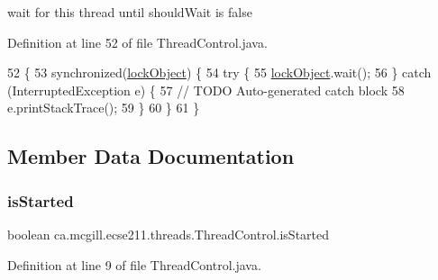 wait for this thread until should\+Wait is false 

Definition at line 52 of file Thread\+Control.\+java.


\begin{DoxyCode}
52                                   \{
53     \textcolor{keyword}{synchronized}(\hyperlink{classca_1_1mcgill_1_1ecse211_1_1threads_1_1_thread_control_ab20c44ff2dafab8981c42fa8bf634dfc}{lockObject}) \{
54       \textcolor{keywordflow}{try} \{
55         \hyperlink{classca_1_1mcgill_1_1ecse211_1_1threads_1_1_thread_control_ab20c44ff2dafab8981c42fa8bf634dfc}{lockObject}.wait();
56       \} \textcolor{keywordflow}{catch} (InterruptedException e) \{
57         \textcolor{comment}{// TODO Auto-generated catch block}
58         e.printStackTrace();
59       \}
60     \}
61   \}
\end{DoxyCode}


\subsection{Member Data Documentation}
\mbox{\label{classca_1_1mcgill_1_1ecse211_1_1threads_1_1_thread_control_abb0ba2385c212f3d0d8435267d882536}} 
\subsubsection{\texorpdfstring{is\+Started}{isStarted}}
{\footnotesize\ttfamily boolean ca.\+mcgill.\+ecse211.\+threads.\+Thread\+Control.\+is\+Started\hspace{0.3cm}{\ttfamily [protected]}}



Definition at line 9 of file Thread\+Control.\+java.

\mbox{\label{classca_1_1mcgill_1_1ecse211_1_1threads_1_1_thread_control_ab20c44ff2dafab8981c42fa8bf634dfc}} 
